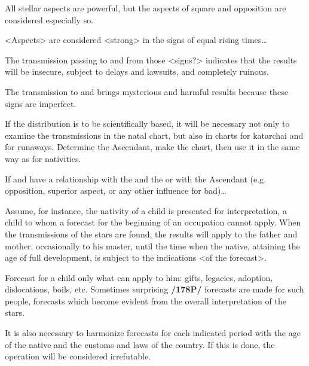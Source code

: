 All  stellar aspects are powerful, but the aspects of square and opposition are considered especially so.

<Aspects> are considered <strong> in the signs of equal rising times\ldots

The transmission passing to \Taurus\xspace and \Virgo\xspace from those <signs?> indicates that the results will be
insecure, subject to delays and lawsuits, and completely ruinous. 

The transmission to \Sagittarius\xspace and \Capricorn\xspace brings mysterious and harmful results because these signs are imperfect.

If the distribution is to be scientifically based, it will be necessary not only to examine the transmissions in the natal chart, but also in charts for katarchai and for runaways. 
Determine the Ascendant, make the chart, then use it in the same way as for nativities.

If \Saturn\xspace and \Mars\xspace have a relationship with the \Sun\xspace and the \Moon\xspace or with the Ascendant (e.g.
opposition, superior aspect, or any other influence for bad)\ldots

Assume, for instance, \mndl the nativity of a child is presented for interpretation, a child to whom a forecast for the beginning of an occupation cannot apply. When the transmissions of the stars are found, the results will apply to the father and mother, occasionally to his master, until the time when the native, attaining the age of full development, is subject to the indications <of the forecast>. 

Forecast for a child only what can apply to him: gifts, legacies, adoption, dislocations, boils, etc. Sometimes surprising \textbf{/178P/} forecasts are made for such people, forecasts which become evident from the overall interpretation of the stars. 

It is also necessary to harmonize forecasts for each indicated period with the age of the native and the customs and laws of the country. If this is done, the operation will be considered irrefutable. 

